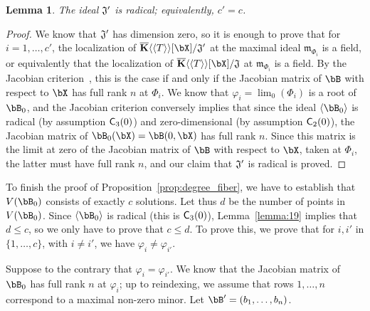 \documentclass[12pt]{article}
\newtheorem{lemma}[definition]{Lemma}
\begin{document}
\begin{lemma}\label{lemma:Jprimerad}
  The ideal $\frak{J}'$ is radical; equivalently, $c'=c$.
\end{lemma}
\begin{proof}
 We know that $\frak{J}'$ has dimension zero, so it is enough to prove
 that for $i=1,\dots,c'$, the localization of $\KKbar\langle\langle T
 \rangle\rangle[\bX]/\frak{J}'$ at the maximal ideal
 $\mathfrak{m}_{\Phi_i}$ is a field, or equivalently that the
 localization of $\KKbar\langle\langle T \rangle\rangle[\bX]/\frak{J}$
 at $\mathfrak{m}_{\Phi_i}$ is a field.  By the Jacobian
 criterion~\cite[Theorem~16.19.b]{Eisenbud95}, this is the case if and
 only if the Jacobian matrix of $\bB$ with respect to $\bX$ has full
 rank $n$ at $\Phi_i$. We know that $\varphi_i=\lim_0(\Phi_i)$ is a
 root of $\bB_0$, and the Jacobian criterion conversely implies that
 since the ideal $\langle \bB_0 \rangle$ is radical (by assumption
 $\mathsf{C}_3(0)$) and zero-dimensional (by assumption $\mathsf{C}_2(0)$),
 the Jacobian matrix of $\bB_0(\bX)=\bB(0,\bX)$ has full rank $n$. Since
 this matrix is the limit at zero of the Jacobian matrix of $\bB$ with
 respect to $\bX$, taken at $\Phi_i$, the latter must have full rank
 $n$, and our claim that $\frak{J}'$ is radical is proved.
\end{proof}

To finish the proof of Proposition~\ref{prop:degree_fiber}, we have to
establish that $V(\bB_0)$ consists of exactly $c$ solutions.  Let thus
$d$ be the number of points in $V(\bB_0)$.  Since $\langle \bB_0
\rangle$ is radical (this is $\mathsf{C}_3(0)$), Lemma~\ref{lemma:19}
implies that $d \le c$, so we only have to prove that $c \le d$. To
prove this, we prove that for $i,i'$ in $\{1,\dots,c\}$, with $i \ne
i'$, we have $\varphi_i \ne \varphi_{i'}$.

Suppose to the contrary that $\varphi_i = \varphi_{i'}$. We know that
the Jacobian matrix of $\bB_0$ has full rank $n$ at $\varphi_i$; up to
reindexing, we assume that rows $1,\dots,n$ correspond to a maximal
non-zero minor. Let $\bB'=(b_1,\dots,b_n)$.
\end{document}
